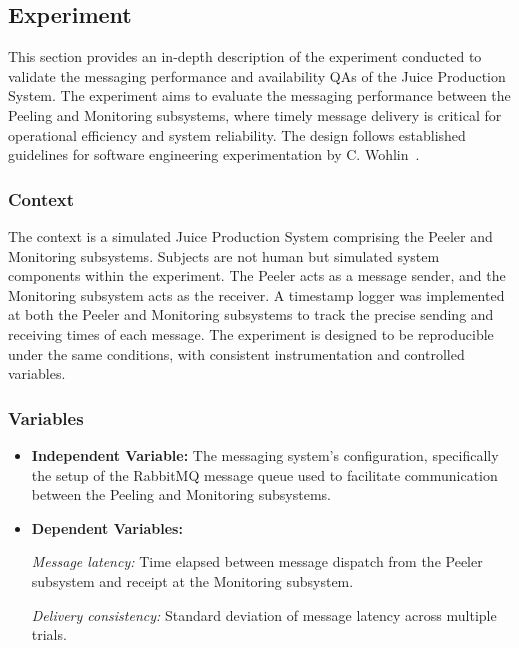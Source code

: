 \documentclass[conference]{IEEEtran}
\begin{document}
\subsection{Experiment}

\color{black}
This section provides an in-depth description of the experiment conducted to validate the messaging performance and availability QAs of the Juice Production System. The experiment aims to evaluate the messaging performance between the Peeling and Monitoring subsystems, where timely message delivery is critical for operational efficiency and system reliability. The design follows established guidelines for software engineering experimentation by C. Wohlin~\cite{b14}.

\subsubsection{Context}
The context is a simulated Juice Production System comprising the Peeler and Monitoring subsystems. Subjects are not human but simulated system components within the experiment. The Peeler acts as a message sender, and the Monitoring subsystem acts as the receiver. A timestamp logger was implemented at both the Peeler and Monitoring subsystems to track the precise sending and receiving times of each message. The experiment is designed to be reproducible under the same conditions, with consistent instrumentation and controlled variables.

\subsubsection{Variables}
\begin{itemize}
    \item \textbf{Independent Variable:} The messaging system's configuration, specifically the setup of the RabbitMQ message queue used to facilitate communication between the Peeling and Monitoring subsystems.
    \item \textbf{Dependent Variables:} 
    
    \textit{Message latency:} Time elapsed between message dispatch from the Peeler subsystem and receipt at the Monitoring subsystem.
    
    \textit{Delivery consistency:} Standard deviation of message latency across multiple trials.
\end{itemize}
\end{document}

